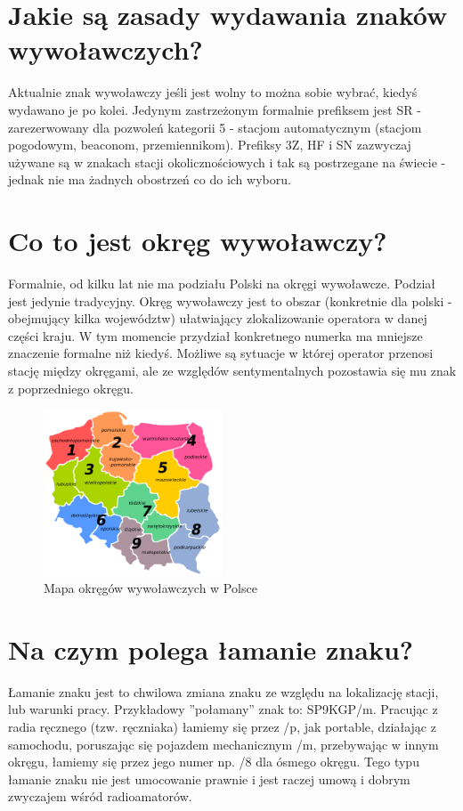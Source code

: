 \documentclass[a4paper,12pt]{article}
\begin{document}
\section{Jakie są zasady wydawania znaków wywoławczych?}
Aktualnie znak wywoławczy jeśli jest wolny to można sobie wybrać, kiedyś wydawano je po kolei. Jedynym zastrzeżonym formalnie prefiksem jest SR - zarezerwowany dla pozwoleń kategorii 5 - stacjom automatycznym (stacjom pogodowym, beaconom, przemiennikom). Prefiksy 3Z, HF i SN zazwyczaj używane są w znakach stacji okolicznościowych i tak są postrzegane na świecie - jednak nie ma żadnych obostrzeń co do ich wyboru.

\section{Co to jest okręg wywoławczy?}
Formalnie, od kilku lat nie ma podziału Polski na okręgi wywoławcze. Podział jest jedynie tradycyjny. Okręg wywoławczy jest to obszar (konkretnie dla polski - obejmujący kilka województw) ułatwiający zlokalizowanie operatora w danej części kraju. W tym momencie przydział konkretnego numerka ma mniejsze znaczenie formalne niż kiedyś. Możliwe są sytuacje w której operator przenosi stację między okręgami, ale ze względów sentymentalnych pozostawia się mu znak z poprzedniego okręgu. 
\begin{figure}[h]
 \centering
 \includegraphics[width=150pt]{./Polish_HAM_Radio_Regions.png}
 \caption{Mapa okręgów wywoławczych w Polsce}
\end{figure}

\section{Na czym polega łamanie znaku?}
Łamanie znaku jest to chwilowa zmiana znaku ze względu na lokalizację stacji, lub warunki pracy. Przykładowy ”połamany” znak to: SP9KGP/m. Pracując z radia ręcznego (tzw. ręczniaka) łamiemy się przez /p, jak portable, działając z samochodu, poruszając się pojazdem mechanicznym /m, przebywając w innym okręgu, łamiemy się przez jego numer np. /8 dla ósmego okręgu. Tego typu łamanie znaku nie jest umocowanie prawnie i jest raczej umową i dobrym zwyczajem wśród radioamatorów.
\end{document}
